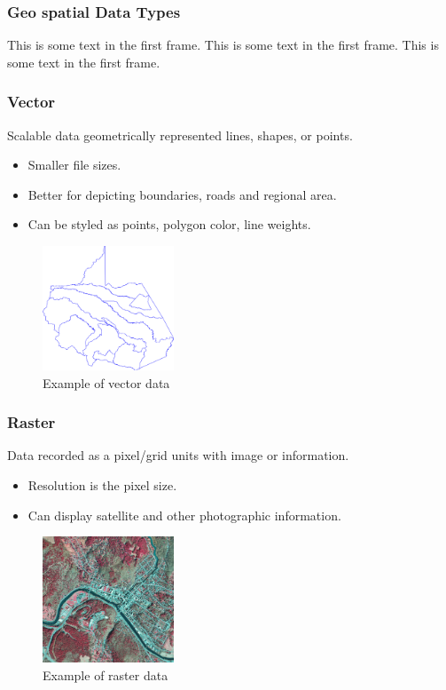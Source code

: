 \documentclass[8.5pt]{beamer}
\begin{document}
\begin{frame}
\frametitle{Geo spatial Data Types}
This is some text in the first frame. This is some text in the first frame. This is some text in the first frame.
\end{frame}

\begin{frame}
\frametitle{Vector}
Scalable data geometrically represented lines, shapes, or points.

\begin{itemize}
    \item Smaller file sizes.
    \item Better for depicting boundaries, roads and regional area.
    \item Can be styled as points, polygon color, line weights.
\end{itemize}

\begin{figure}
    \centering
    \includegraphics[width=0.35\textwidth]{images/vector.png}
    \caption{Example of vector data}
    \label{fig:vector}
\end{figure}

\end{frame}

\begin{frame}
\frametitle{Raster}

Data recorded as a pixel/grid units with image or information.

\begin{itemize}
    \item Resolution is the pixel size.
    \item Can display satellite and other photographic information.
\end{itemize}

\begin{figure}
    \centering
    \includegraphics[width=0.35\textwidth]{images/raster.png}
    \caption{Example of raster data}
    \label{fig:raster}
\end{figure}

\end{frame}
\end{document}
